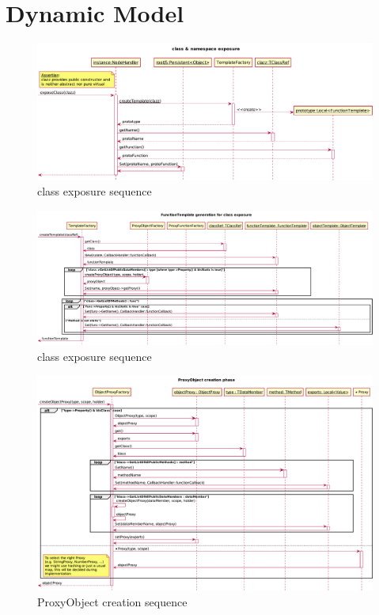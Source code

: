 \section{Dynamic Model}

\begin{figure}[htb]
	\centering
	\includegraphics[width=18cm]{./latex/resources/classExposureSequence.pdf}
	\caption{class exposure sequence}
\end{figure}

\begin{figure}[htb]
	\centering
	\includegraphics[width=18cm]{./latex/resources/functionTemplateGenerate.pdf}
	\caption{class exposure sequence}
\end{figure}

\begin{figure}[htb]
	\centering
	\includegraphics[width=18cm]{./latex/resources/createProxyObject.pdf}
	\caption{ProxyObject creation sequence}
\end{figure}

\newpage

